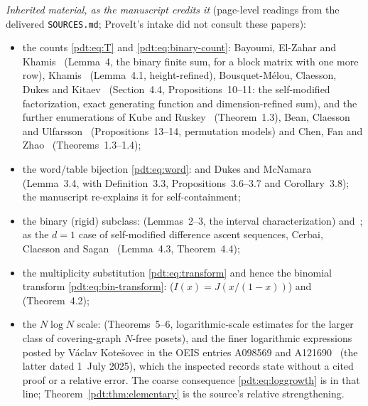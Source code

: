 \begin{writenote}
\emph{Inherited material, as the manuscript credits it} (page-level
readings from the delivered \nolinkurl{SOURCES.md}; ProveIt's intake did
not consult these papers):
\begin{itemize}
\item the counts \eqref{pdt:eq:T} and \eqref{pdt:eq:binary-count}:
 Bayoumi, El-Zahar and Khamis~\cite{bek} (Lemma~4, the binary finite sum,
 for a block matrix with one more row), Khamis~\cite{khamis} (Lemma~4.1,
 height-refined), Bousquet-M\'elou, Claesson, Dukes and
 Kitaev~\cite{bcdk} (Section~4.4, Propositions~10--11: the self-modified
 factorization, exact generating function and dimension-refined sum), and
 the further enumerations of Kube and Ruskey~\cite{kr} (Theorem~1.3), Bean,
 Claesson and Ulfarsson~\cite{bcuf} (Propositions~13--14, permutation
 models) and Chen, Fan and Zhao~\cite{cfz} (Theorems~1.3--1.4);
\item the word/table bijection \eqref{pdt:eq:word}: \cite{bcdk} and Dukes
 and McNamara~\cite{dm} (Lemma~3.4, with Definition~3.3,
 Propositions~3.6--3.7 and Corollary~3.8); the manuscript re-explains it for
 self-containment;
\item the binary (rigid) subclass: \cite{bek} (Lemmas~2--3, the interval
 characterization) and~\cite{khamis}; as the $d=1$ case of self-modified
 difference ascent sequences, Cerbai, Claesson and Sagan~\cite{ccs}
 (Lemma~4.3, Theorem~4.4);
\item the multiplicity substitution \eqref{pdt:eq:transform} and hence the
 binomial transform \eqref{pdt:eq:bin-transform}: \cite{bek} ($I(x)=J(x/(1-x))$)
 and \cite{khamis} (Theorem~4.2);
\item the $N\log N$ scale: \cite{bek} (Theorems~5--6, logarithmic-scale
 estimates for the larger class of covering-graph $N$-free posets), and the
 finer logarithmic expressions posted by V\'aclav Kote\v{s}ovec in the OEIS
 entries A098569 and A121690~\cite{oeis} (the latter dated 1~July 2025),
 which the inspected records state without a cited proof or a relative
 error. The coarse consequence \eqref{pdt:eq:loggrowth} is in that line;
 Theorem~\ref{pdt:thm:elementary} is the source's relative strengthening.
\end{itemize}


\end{writenote}
